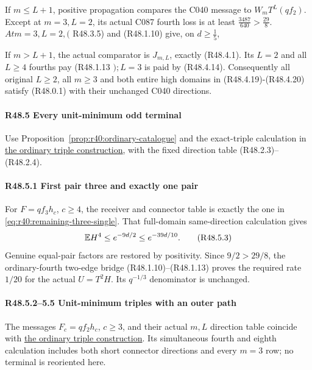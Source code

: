
If \(m\le L+1\), positive propagation compares the C040 message to \(W_m T^L(q f_{2})\). Except at \(m=3,\allowbreak \allowbreak L=2\), its actual C087 fourth loss is at least \(\frac{3487}{640}>\frac{29}{8}\). \(At m=3,\allowbreak \allowbreak L=2,\allowbreak \allowbreak  (\) R48.3.5) and (R48.1.10) give, on \(d\ge \frac{1}{5}\),


If \(m>L+1\), the actual comparator is \(J_{m,\allowbreak \allowbreak L}\), exactly (R48.4.1). Its \(L=2\) and all \(L\ge 4\) fourths pay (R48.1.13 \(); L=3\) is paid by (R48.4.14). Consequently all original \(L\ge 2\), all \(m\ge 3\) and both entire high domains in (R48.4.19)-(R48.4.20) satisfy (R48.0.1) with their unchanged C040 directions.

\paragraph{R48.5 Every unit-minimum odd terminal}\label{part:R48.5}

Use Proposition~\ref{prop:r40:ordinary-catalogue} and the exact-triple calculation in \hyperref[part:outer-unit:triples]{the ordinary triple construction}, with the fixed direction table (R48.2.3)--(R48.2.4).

\paragraph{R48.5.1 First pair three and exactly one pair}
For \(F=qf_3h_c\), \(c\ge4\), the receiver and connector table is
exactly the one in \eqref{eq:r40:remaining-three-single}.
That full-domain same-direction calculation gives
\[
 \mathbb E H^4\le e^{-9d/2}\le e^{-39d/10}.
 \tag{R48.5.3}
\]
Genuine equal-pair factors are restored by positivity.
Since \(9/2>29/8\), the ordinary-fourth two-edge bridge
(R48.1.10)--(R48.1.13) proves the required rate \(1/20\) for the
actual \(U=T^2H\). Its \(q^{-1/3}\) denominator is unchanged.

\paragraph{R48.5.2--5.5 Unit-minimum triples with an outer path}
\label{part:outer-unit:outer}
The messages \(F_c=qf_2h_c\), \(c\ge3\), and their actual
\(m,L\) direction table coincide with
\hyperref[part:outer-unit:triples]{the ordinary triple construction}.
Its simultaneous fourth and eighth calculation includes both short
connector directions and every \(m=3\) row; no terminal is reoriented here.

